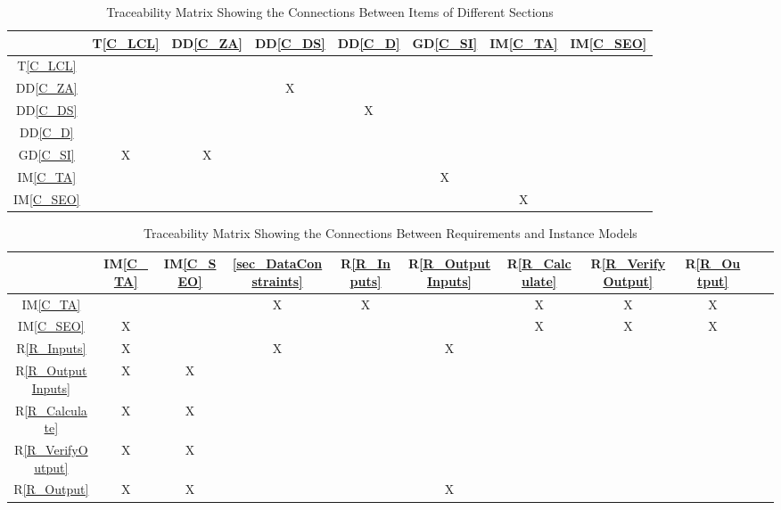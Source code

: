 \documentclass[12pt]{article}
\newcommand{\dref}[1]{GD\ref{#1}}
\newcommand{\ddref}[1]{DD\ref{#1}}
\newcommand{\tref}[1]{T\ref{#1}}
\newcommand{\iref}[1]{IM\ref{#1}}
\newcommand{\rref}[1]{R\ref{#1}}
\begin{document}
\begin{table}[h!]
\centering
\begin{tabular}{|c|c|c|c|c|c|c|c|}
\hline        
	& \tref{C_LCL}& \ddref{C_ZA} & \ddref{C_DS}&\ddref{C_D} & \dref{C_SI} &\iref{C_TA}  &\iref{C_SEO} \\
\hline
\tref{C_LCL}        &    &    &     &    &    &    &     \\ \hline
\ddref{C_ZA}       &    &    & X  &    &    &    &      \\ \hline
\ddref{C_DS}       &    &    &     & X &    &    &     \\ \hline
\ddref{C_D}         &    &    &     &    &    &    &     \\ \hline
\dref{C_SI}          & X & X &     &    &    &    &       \\ \hline
\iref{C_TA}          &    &     &     &    & X &    &      \\ \hline
\iref{C_SEO}       &    &     &     &    &    & X &        \\ \hline


\hline
\end{tabular}
\caption{Traceability Matrix Showing the Connections Between Items of Different Sections}
\label{Table:trace}
\end{table}

\begin{table}[h!]
\centering
\begin{tabular}{|c|c|c|c|c|c|c|c|c|c|c|}
\hline
	& \iref{C_TA}  & \iref{C_SEO}& \ref{sec_DataConstraints}& \rref{R_Inputs}& \rref{R_OutputInputs} & \rref{R_Calculate}& \rref{R_VerifyOutput}& \rref{R_Output}\\

\hline
\iref{C_TA}         				&    &    & X & X &     & X  & X  &X \\ \hline
\iref{C_SEO}           		& X &    &    &    &     & X  & X  &X \\ \hline
\rref{R_Inputs}    				& X &    & X &    & X  &     &     &     \\ \hline
\rref{R_OutputInputs}  & X & X &    &    &     &     &     &     \\ \hline
\rref{R_Calculate}  		& X & X &    &    &     &     &     &     \\ \hline
\rref{R_VerifyOutput}  & X & X &    &    &     &      &     &    \\ \hline 
\rref{R_Output}       		& X & X &    &    & X &      &     &    \\ \hline
\hline
\end{tabular}
\caption{Traceability Matrix Showing the Connections Between Requirements and Instance Models}
\label{Table:R_trace}
\end{table}
\end{document}
